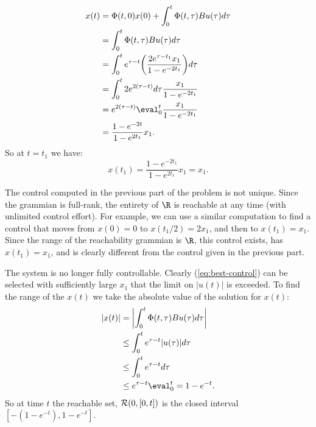 \documentclass{homework}
\begin{document}
\begin{letterenum}
\begin{align*}
    x(t) &= \Phi(t, 0) x(0) + \int_0^t \Phi(t, \tau) B u(\tau) d\tau \\
        &= \int_0^t \Phi(t, \tau) B u(\tau) d\tau \\
        &= \int_0^t e^{\tau - t} \biggl(
            \frac{2e^{\tau - t_1}x_1}{1 - e^{-2t_1}}
        \biggr) d\tau \\
        &= \int_{0}^{t} 2 e^{2(\tau - t)} d\tau \frac{x_1}{1 - e^{-2t_1}} \\
        &=  e^{2(\tau - t)}\eval_0^t \frac{x_1}{1 - e^{-2t_1}} \\
        &= \frac{1 - e^{-2t}}{1 - e^{2t_1}} x_1.
\end{align*}
So at $t=t_1$ we have:
\begin{equation*}
    x(t_1) = \frac{1 - e^{-2t_1}}{1 - e^{2t_1}} x_1 = x_1.
\end{equation*}

\item The control computed in the previous part of the problem is not
unique. Since the grammian is full-rank, the entirety of $\R$ is reachable
at any time (with unlimited control effort). For example, we can use
a similar computation to find a control that moves from $x(0) = 0$ to
$x(t_1/2) = 2x_1$, and then to $x(t_1) = x_1$. Since the range of 
the reachability grammian is $\R$, this control exists, has $x(t_1) = x_1$,
and is clearly different from the control given in the previous part.

\item The system is no longer fully controllable. Clearly (\ref{eq:best-control})
can be selected with sufficiently large $x_1$ that the limit on $|u(t)|$ is
exceeded. To find the range of the $x(t)$ we take the absolute
value of the solution for $x(t)$:
\begin{align*}
    |x(t)| &= \biggl|
        \int_{0}^{t} \Phi(t, \tau) B u(\tau) d\tau
    \biggr| \\
    &\leq \int_{0}^{t} e^{\tau - t} |u(\tau)| d\tau \\
    &\leq \int_{0}^{t} e^{\tau - t} d\tau \\
    &\leq e^{\tau - t} \eval_0^t = 1 - e^{-t}.
\end{align*}
So at time $t$ the reachable set, $\mathcal{R}(0, [0, t])$ is the closed
interval $[-(1 - e^{-t}), 1 - e^{-t}]$.

\subsection{}


\end{letterenum}
\end{document}
